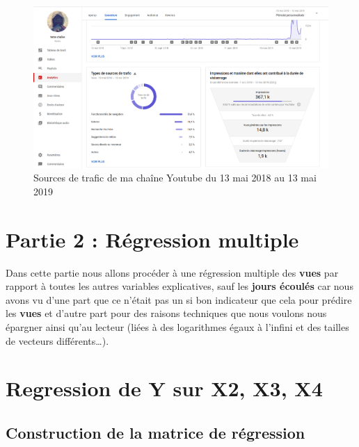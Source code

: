 \begin{Schunk}
\begin{figure}[htbp]

{\centering \includegraphics[width=6in]{youtubeAlgorithm} 

}

\caption[Sources de trafic de ma chaîne Youtube du 13 mai 2018 au 13 mai 2019 ]{Sources de trafic de ma chaîne Youtube du 13 mai 2018 au 13 mai 2019 }\label{fig:youtubeAlgorithm}
\end{figure}
\end{Schunk}

\newpage

\hypertarget{partie-2-ruxe9gression-multiple}{%
\section{Partie 2 : Régression
multiple}\label{partie-2-ruxe9gression-multiple}}

Dans cette partie nous allons procéder à une régression multiple des
\textbf{vues} par rapport à toutes les autres variables explicatives,
sauf les \textbf{jours écoulés} car nous avons vu d'une part que ce
n'était pas un si bon indicateur que cela pour prédire les \textbf{vues}
et d'autre part pour des raisons techniques que nous voulons nous
épargner ainsi qu'au lecteur (liées à des logarithmes égaux à l'infini
et des tailles de vecteurs différents\ldots).

\hypertarget{regression-de-y-sur-x2-x3-x4}{%
\section{Regression de Y sur X2, X3,
X4}\label{regression-de-y-sur-x2-x3-x4}}

\hypertarget{construction-de-la-matrice-de-ruxe9gression}{%
\subsection{Construction de la matrice de
régression}\label{construction-de-la-matrice-de-ruxe9gression}}

